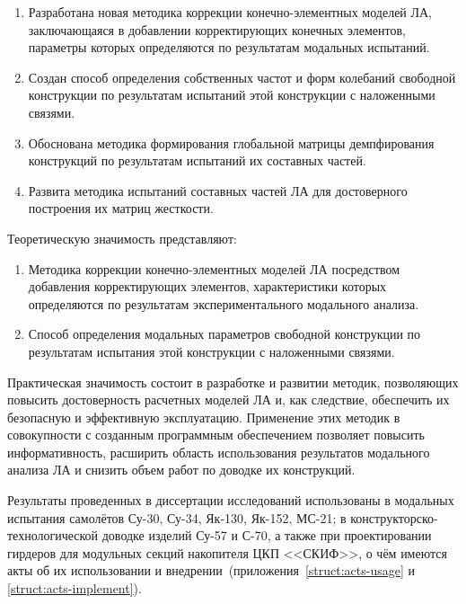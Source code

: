 {\novelty}
\begin{enumerate}[beginpenalty = 10000] 
	\item Разработана новая методика коррекции конечно-элементных моделей ЛА, заключающаяся в добавлении корректирующих конечных элементов, параметры которых определяются по результатам модальных испытаний.
	\item Создан способ определения собственных частот и форм колебаний свободной конструкции по результатам испытаний этой конструкции с наложенными связями.
	\item Обоснована методика формирования глобальной матрицы демпфирования конструкций по результатам испытаний их составных частей.
	\item Развита методика испытаний составных частей ЛА для достоверного построения их матриц жесткости.
\end{enumerate}

{\influence}

Теоретическую значимость представляют:
\begin{enumerate}[beginpenalty = 10000] 
	\item Методика коррекции конечно-элементных моделей ЛА посредством добавления корректирующих элементов, характеристики которых определяются по результатам экспериментального модального анализа.
	\item Способ определения модальных параметров свободной конструкции по результатам испытания этой конструкции с наложенными связями. 
\end{enumerate}

Практическая значимость состоит в разработке и развитии методик, позволяющих повысить достоверность расчетных моделей ЛА и, как следствие, обеспечить их безопасную и эффективную эксплуатацию. Применение этих методик в совокупности с созданным программным обеспечением позволяет повысить информативность, расширить область использования результатов модального анализа ЛА и снизить объем работ по доводке их конструкций.

Результаты проведенных в диссертации исследований использованы в модальных испытания самолётов \mbox{Су-30}, \mbox{Су-34}, \mbox{Як-130}, \mbox{Як-152}, \mbox{МС-21}; в конструкторско-технологической доводке изделий \mbox{Су-57} и \mbox{С-70}, а также при проектировании  гирдеров для модульных секций накопителя ЦКП <<СКИФ>>, о чём имеются акты об их использовании и внедрении~(приложения~\ref{struct:acts-usage} и \ref{struct:acts-implement}).

{\methods}

